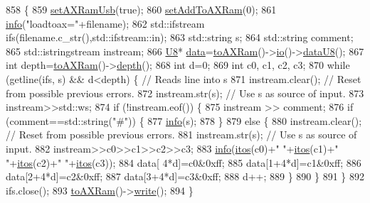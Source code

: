 \begin{DoxyCode}
858                                      \{
859   \hyperlink{classA3PE_a77ccfbd9df2fad96a9a9f1dc579a7a2d}{setAXRamUsb}(\textcolor{keyword}{true});
860   \hyperlink{classA3PE_a54fe4da570ea8833fe2c981de1085387}{setAddToAXRam}(0);
861   \hyperlink{classObject_a644fd329ea4cb85f54fa6846484b84a8}{info}(\textcolor{stringliteral}{"loadtoax="}+filename);
862   std::ifstream ifs(filename.c\_str(),std::ifstream::in);
863   std::string s;
864   std::string comment;
865   std::istringstream instream;
866   \hyperlink{ICECALv3_8h_a3cb25ca6f51f003950f9625ff05536fc}{U8}* \hyperlink{namespaceshell_a5ea2525995cedc3efd69ea8a7f034d1e}{data}=\hyperlink{classA3PE_a16b16ac12705b9dd93d70fa172deb584}{toAXRam}()->\hyperlink{classIOobject_af04fb94137c3d86849f478ac5afab5d1}{io}()->\hyperlink{classIOdata_a75e9c318dbac3a39402179070943d4bc}{dataU8}();
867   \textcolor{keywordtype}{int} depth=\hyperlink{classA3PE_a16b16ac12705b9dd93d70fa172deb584}{toAXRam}()->\hyperlink{classRAM_aa36cbedb8a970a01ee07a9637553887f}{depth}();
868   \textcolor{keywordtype}{int} d=0;
869   \textcolor{keywordtype}{int} c0, c1, c2, c3;
870   \textcolor{keywordflow}{while} (getline(ifs, s) && d<depth) \{ \textcolor{comment}{// Reads line into s}
871       instream.clear();     \textcolor{comment}{// Reset from possible previous errors.}
872       instream.str(s);      \textcolor{comment}{// Use s as source of input.}
873       instream>>std::ws;
874       \textcolor{keywordflow}{if} (!instream.eof()) \{
875         instream >> comment;
876         \textcolor{keywordflow}{if} (comment==std::string(\textcolor{stringliteral}{"#"})) \{
877           \hyperlink{classObject_a644fd329ea4cb85f54fa6846484b84a8}{info}(s);
878         \}
879         \textcolor{keywordflow}{else} \{
880           instream.clear();     \textcolor{comment}{// Reset from possible previous errors.}
881           instream.str(s);      \textcolor{comment}{// Use s as source of input.}
882           instream>>c0>>c1>>c2>>c3;
883           \hyperlink{classObject_a644fd329ea4cb85f54fa6846484b84a8}{info}(\hyperlink{Tools_8h_af330027dbdafb9a30768b3613c553e60}{itos}(c0)+\textcolor{stringliteral}{" "}+\hyperlink{Tools_8h_af330027dbdafb9a30768b3613c553e60}{itos}(c1)+\textcolor{stringliteral}{" "}+\hyperlink{Tools_8h_af330027dbdafb9a30768b3613c553e60}{itos}(c2)+\textcolor{stringliteral}{" "}+\hyperlink{Tools_8h_af330027dbdafb9a30768b3613c553e60}{itos}(c3));
884           data[  4*d]=c0&0xff;
885           data[1+4*d]=c1&0xff;
886           data[2+4*d]=c2&0xff;
887           data[3+4*d]=c3&0xff;
888           d++;
889         \}
890       \}
891   \}
892   ifs.close();
893   \hyperlink{classA3PE_a16b16ac12705b9dd93d70fa172deb584}{toAXRam}()->\hyperlink{classIOobject_a9f6984bc9f0fadcf800f1be2523ac744}{write}();
894 \}
\end{DoxyCode}
\mbox{\label{classA3PE_a34a9499a0d9065a1b5772880d7e8d5c4}} 
